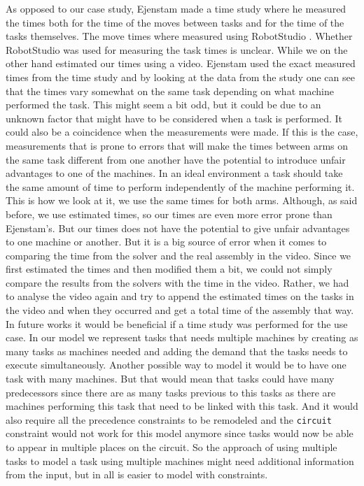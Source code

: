 As opposed to our case study, Ejenstam made a time study where he measured the times both for the time of the moves between tasks and for the time of the tasks themselves. The move times where measured using RobotStudio \cite{robotstudio}. Whether RobotStudio was used for measuring the task times is unclear. While we on the other hand estimated our times using a video. Ejenstam used the exact measured times from the time study and by looking at the data from the study one can see that the times vary somewhat on the same task depending on what machine performed the task. This might seem a bit odd, but it could be due to an unknown factor that might have to be considered when a task is performed. It could also be a coincidence when the measurements were made. If this is the case, measurements that is prone to errors that will make the times between arms on the same task different from one another have the potential to introduce unfair advantages to one of the machines. In an ideal environment a task should take the same amount of time to perform independently of the machine performing it. This is how we look at it, we use the same times for both arms. Although, as said before, we use estimated times, so our times are even more error prone than Ejenstam's. But our times does not have the potential to give unfair advantages to one machine or another. But it is a big source of error when it comes to comparing the time from the solver and the real assembly in the video. Since we first estimated the times and then modified them a bit, we could not simply compare the results from the solvers with the time in the video. Rather, we had to analyse the video again and try to append the estimated times on the tasks in the video and when they occurred and get a total time of the assembly that way. In future works it would be beneficial if a time study was performed for the use case.
\newpage
In our model we represent tasks that needs multiple machines by creating as many tasks as machines needed and adding the demand that the tasks needs to execute simultaneously. Another possible way to model it would be to have one task with many machines. But that would mean that tasks could have many predecessors since there are as many tasks previous to this tasks as there are machines performing this task that need to be linked with this task. And it would also require all the precedence constraints to be remodeled and the \texttt{circuit} constraint would not work for this model anymore since tasks would now be able to appear in multiple places on the circuit. So the approach of using multiple tasks to model a task using multiple machines might need additional information from the input, but in all is easier to model with constraints.

